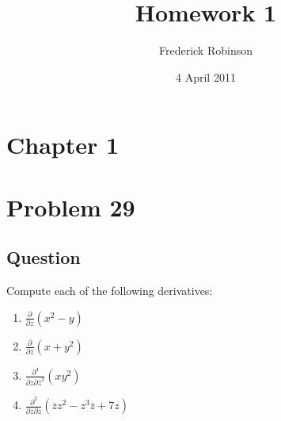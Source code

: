 \documentclass[11pt]{article}
\begin{document}



\title{Homework 1}
\author{Frederick Robinson}
\date{4 April 2011}
\maketitle

\section*{Chapter 1}


\section{Problem  29}
\subsection{Question}
Compute each of the following derivatives:
\begin{enumerate}
\item $\displaystyle \frac{\partial}{\partial z} (x^2 - y )$
\item $\displaystyle \frac{\partial}{\partial \overline{z}}(x + y^2) $
\item $\displaystyle \frac{\partial^4}{\partial z \partial \overline{z}^3} (x y ^2) $
\item $\displaystyle \frac{\partial^2}{\partial \overline{z} \partial z}  ( \overline{z} z^2 - z^3 \overline{z} + 7 z ) $
\end{enumerate}
\end{document}
